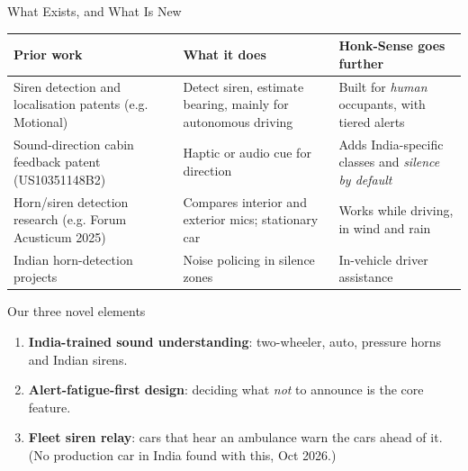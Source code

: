 \documentclass[aspectratio=169,10pt,t,xcolor=table]{beamer}
\renewcommand{\arraystretch}{1.18}
\begin{document}
\begin{frame}{What Exists, and What Is New}
\footnotesize\renewcommand{\arraystretch}{1.2}
\begin{tabularx}{\textwidth}{@{}p{4.3cm}YY@{}}
\toprule
\textbf{Prior work} & \textbf{What it does} & \textbf{Honk-Sense goes further} \\
\midrule
Siren detection and localisation patents (e.g. Motional) & Detect siren, estimate bearing, mainly for autonomous driving & Built for \emph{human} occupants, with tiered alerts \\
Sound-direction cabin feedback patent (US10351148B2) & Haptic or audio cue for direction & Adds India-specific classes and \emph{silence by default} \\
Horn/siren detection research (e.g. Forum Acusticum 2025) & Compares interior and exterior mics; stationary car & Works while driving, in wind and rain \\
Indian horn-detection projects & Noise policing in silence zones & In-vehicle driver assistance \\
\bottomrule
\end{tabularx}
\vspace{4pt}
\begin{block}{Our three novel elements}
\begin{enumerate}\small
  \item \textbf{India-trained sound understanding}: two-wheeler, auto, pressure horns and Indian sirens.
  \item \textbf{Alert-fatigue-first design}: deciding what \emph{not} to announce is the core feature.
  \item \textbf{Fleet siren relay}: cars that hear an ambulance warn the cars ahead of it. {\tiny\color{muted}(No production car in India found with this, Oct 2026.)}
\end{enumerate}
\end{block}
\end{frame}
\end{document}
